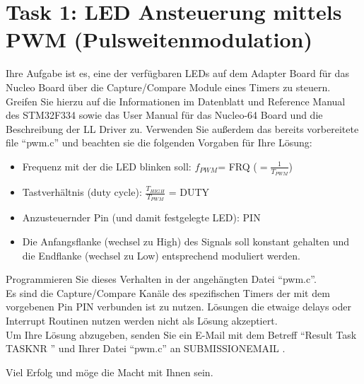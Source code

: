 \documentclass[a4paper,12pt]{article}
\begin{document}
\pagestyle{empty}
\setlength{\parindent}{0em}
\section*{Task 1: LED Ansteuerung mittels PWM (Pulsweitenmodulation)}

Ihre Aufgabe ist es, eine der verfügbaren LEDs auf dem Adapter Board für das Nucleo Board über die Capture/Compare Module eines Timers zu steuern. Greifen Sie hierzu auf die Informationen im Datenblatt \cite{data_sheet} und Reference Manual \cite{ref_manual} des STM32F334 sowie das User Manual für das Nucleo-64 Board \cite{nucleo_manual} und die Beschreibung der LL Driver \cite{driver_manual} zu. Verwenden Sie außerdem das bereits vorbereitete file \enquote{pwm.c} und beachten sie die folgenden Vorgaben für Ihre Lösung:

\begin{itemize}
\item Frequenz mit der die LED blinken soll: $f_{PWM}$= {{FRQ}} ($=\frac{1}{T_{PWM}}$)
\item Tastverh\"altnis (duty cycle):  $\frac{T_{HIGH}}{T_{PWM}}$ = {{DUTY}}
\item Anzusteuernder Pin (und damit festgelegte LED): {{ PIN }}
\item Die Anfangsflanke (wechsel zu High) des Signals soll konstant gehalten und die Endflanke (wechsel zu Low) entsprechend moduliert werden.
\end{itemize}
\vspace{0.3cm}

Programmieren Sie dieses Verhalten in der angeh\"angten Datei \enquote{pwm.c}.
\\

Es sind die Capture/Compare Kanäle des spezifischen Timers der mit dem vorgebenen Pin {{ PIN }} verbunden ist zu nutzen. Lösungen die etwaige delays oder Interrupt Routinen nutzen werden nicht als Lösung akzeptiert.
\\

Um Ihre L\"osung abzugeben, senden Sie ein E-Mail mit dem Betreff \enquote{Result Task {{ TASKNR }}} und Ihrer Datei \enquote{pwm.c}  an {{ SUBMISSIONEMAIL }}.

\vspace{0.7cm}

Viel Erfolg und m\"oge die Macht mit Ihnen sein.

\printbibliography[heading=bibintoc]
\end{document}
